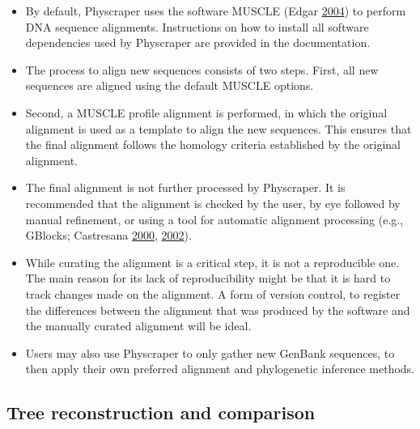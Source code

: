 \documentclass[]{article}
\providecommand{\tightlist}{%
  \setlength{\itemsep}{0pt}\setlength{\parskip}{0pt}}
\begin{document}
\begin{itemize}
\tightlist
\item
  By default, Physcraper uses the software MUSCLE (Edgar \protect\hyperlink{ref-edgar2004muscle}{2004}) to perform DNA sequence alignments. Instructions on how to install all software dependencies used by Physcraper are provided in the documentation.
\item
  The process to align new sequences consists of two steps. First, all new sequences are aligned using the default MUSCLE options.
\item
  Second, a MUSCLE profile alignment is performed, in which the original alignment
  is used as a template to align the new sequences. This ensures that the final alignment
  follows the homology criteria established by the original alignment.
\item
  The final alignment is not further processed by Physcraper. It is recommended that the alignment is checked by the user, by eye followed by manual refinement, or using a tool for automatic alignment processing (e.g., GBlocks; Castresana \protect\hyperlink{ref-castresana2000selection}{2000}, \protect\hyperlink{ref-castresana2002gblocks}{2002}).
\item
  While curating the alignment is a critical step, it is not a reproducible one. The main reason for its lack of reproducibility might be that it is hard to track changes made on the alignment. A form of version control, to register the differences between the alignment that was produced by the software and the manually curated alignment will be ideal.
\item
  Users may also use Physcraper to only gather new GenBank sequences, to then apply their own preferred alignment and phylogenetic inference methods.
\end{itemize}

\hypertarget{tree-reconstruction-and-comparison}{%
\subsection{Tree reconstruction and comparison}\label{tree-reconstruction-and-comparison}}
\end{document}
